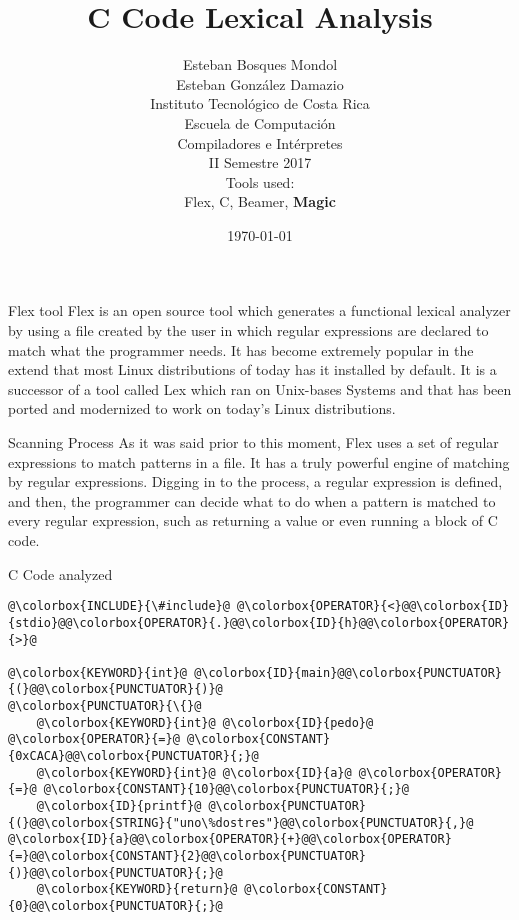 \documentclass{beamer} %
\title[]{C Code Lexical Analysis}
\author[Bosques \& G. Damazio]{Esteban Bosques Mondol \\ Esteban Gonz\'alez Damazio \\[1\baselineskip]
	Instituto Tecnol\'ogico de Costa Rica \\
	Escuela de Computaci\'on\\
	Compiladores e Int\'erpretes \\
	II Semestre 2017\\[1\baselineskip]
	Tools used: \\
	Flex, C, Beamer,	{\bfseries \large Magic}
}
\date{\today}
\begin{document}
	
	\begin{frame}
	\titlepage
\end{frame}

\begin{frame}{Flex tool}
	Flex is an open source tool which generates a functional lexical analyzer by using a file created by the user in which regular expressions are declared to match what the programmer needs. It has become extremely popular in the extend that most Linux distributions of today has it installed by default. It is a successor of a tool called Lex which ran on Unix-bases Systems and that has been ported and modernized to work on today's Linux distributions.
\end{frame}

\begin{frame}{Scanning Process}
As it was said prior to this moment, Flex uses a set of regular expressions to match patterns in a file. It has a truly powerful engine of matching by regular expressions. Digging in to the process, a regular expression is defined, and then, the programmer can decide what to do when a pattern is matched to every regular expression, such as returning a value or even running a block of C code.
\end{frame}







\begin{frame}[fragile]{C Code analyzed}
\begin{flushleft}
	\begin{lstlisting}[breaklines]
@\colorbox{INCLUDE}{\#include}@ @\colorbox{OPERATOR}{<}@@\colorbox{ID}{stdio}@@\colorbox{OPERATOR}{.}@@\colorbox{ID}{h}@@\colorbox{OPERATOR}{>}@

@\colorbox{KEYWORD}{int}@ @\colorbox{ID}{main}@@\colorbox{PUNCTUATOR}{(}@@\colorbox{PUNCTUATOR}{)}@
@\colorbox{PUNCTUATOR}{\{}@
	@\colorbox{KEYWORD}{int}@ @\colorbox{ID}{pedo}@ @\colorbox{OPERATOR}{=}@ @\colorbox{CONSTANT}{0xCACA}@@\colorbox{PUNCTUATOR}{;}@
	@\colorbox{KEYWORD}{int}@ @\colorbox{ID}{a}@ @\colorbox{OPERATOR}{=}@ @\colorbox{CONSTANT}{10}@@\colorbox{PUNCTUATOR}{;}@
	@\colorbox{ID}{printf}@ @\colorbox{PUNCTUATOR}{(}@@\colorbox{STRING}{"uno\%dostres"}@@\colorbox{PUNCTUATOR}{,}@ @\colorbox{ID}{a}@@\colorbox{OPERATOR}{+}@@\colorbox{OPERATOR}{=}@@\colorbox{CONSTANT}{2}@@\colorbox{PUNCTUATOR}{)}@@\colorbox{PUNCTUATOR}{;}@
    @\colorbox{KEYWORD}{return}@ @\colorbox{CONSTANT}{0}@@\colorbox{PUNCTUATOR}{;}@
		\end{lstlisting}
	\end{flushleft}
\end{frame}
\end{document}
